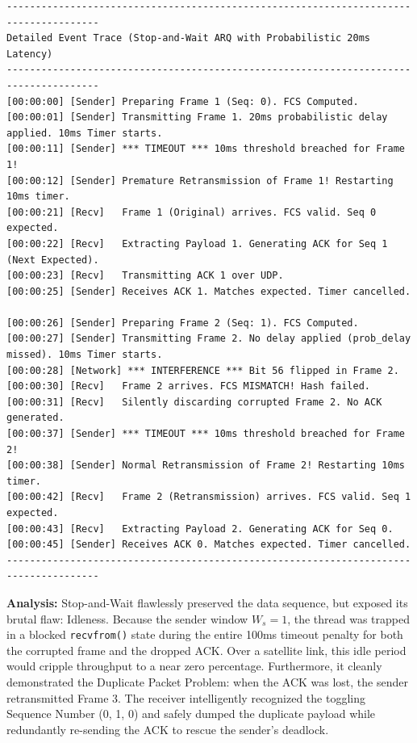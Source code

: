 \documentclass[12pt, a4paper]{article}
\begin{document}
\begin{scriptsize}
\begin{verbatim}
--------------------------------------------------------------------------------------
Detailed Event Trace (Stop-and-Wait ARQ with Probabilistic 20ms Latency)
--------------------------------------------------------------------------------------
[00:00:00] [Sender] Preparing Frame 1 (Seq: 0). FCS Computed.
[00:00:01] [Sender] Transmitting Frame 1. 20ms probabilistic delay applied. 10ms Timer starts.
[00:00:11] [Sender] *** TIMEOUT *** 10ms threshold breached for Frame 1!
[00:00:12] [Sender] Premature Retransmission of Frame 1! Restarting 10ms timer.
[00:00:21] [Recv]   Frame 1 (Original) arrives. FCS valid. Seq 0 expected. 
[00:00:22] [Recv]   Extracting Payload 1. Generating ACK for Seq 1 (Next Expected).
[00:00:23] [Recv]   Transmitting ACK 1 over UDP.
[00:00:25] [Sender] Receives ACK 1. Matches expected. Timer cancelled. 

[00:00:26] [Sender] Preparing Frame 2 (Seq: 1). FCS Computed.
[00:00:27] [Sender] Transmitting Frame 2. No delay applied (prob_delay missed). 10ms Timer starts.
[00:00:28] [Network] *** INTERFERENCE *** Bit 56 flipped in Frame 2.
[00:00:30] [Recv]   Frame 2 arrives. FCS MISMATCH! Hash failed.
[00:00:31] [Recv]   Silently discarding corrupted Frame 2. No ACK generated.
[00:00:37] [Sender] *** TIMEOUT *** 10ms threshold breached for Frame 2!
[00:00:38] [Sender] Normal Retransmission of Frame 2! Restarting 10ms timer.
[00:00:42] [Recv]   Frame 2 (Retransmission) arrives. FCS valid. Seq 1 expected.
[00:00:43] [Recv]   Extracting Payload 2. Generating ACK for Seq 0.
[00:00:45] [Sender] Receives ACK 0. Matches expected. Timer cancelled.
--------------------------------------------------------------------------------------
\end{verbatim}
\end{scriptsize}

\textbf{Analysis:} Stop-and-Wait flawlessly preserved the data sequence, but exposed its brutal flaw: Idleness. Because the sender window $W_s = 1$, the thread was trapped in a blocked \texttt{recvfrom()} state during the entire 100ms timeout penalty for both the corrupted frame and the dropped ACK. Over a satellite link, this idle period would cripple throughput to a near zero percentage. Furthermore, it cleanly demonstrated the Duplicate Packet Problem: when the ACK was lost, the sender retransmitted Frame 3. The receiver intelligently recognized the toggling Sequence Number (0, 1, 0) and safely dumped the duplicate payload while redundantly re-sending the ACK to rescue the sender's deadlock.
\end{document}
